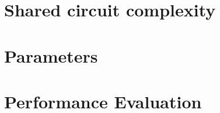 \documentclass[USenglish,oneside,twocolumn]{article}
\begin{document}
\section{Shared circuit complexity}
\label{app:shared_ciruit}

\section{Parameters}
\label{app:Parameters}

\section{Performance Evaluation}
\label{sec:performancecompare}


\end{document}
